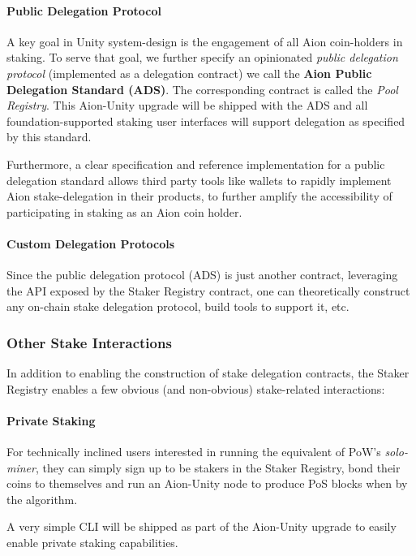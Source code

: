 \paragraph{Public Delegation Protocol}
A key goal in Unity system-design is the engagement of all Aion coin-holders in staking. To serve that goal, we further specify an opinionated \textit{public delegation protocol} (implemented as a delegation contract) we call the \textbf{Aion Public Delegation Standard (ADS)}. The corresponding contract is called the \textit{Pool Registry}. This Aion-Unity upgrade will be shipped with the ADS and all foundation-supported staking user interfaces will support delegation as specified by this standard. 

Furthermore, a clear specification and reference implementation for a public delegation standard allows third party tools like wallets to rapidly implement Aion stake-delegation in their products, to further amplify the accessibility of participating in staking as an Aion coin holder. 
    
\paragraph{Custom Delegation Protocols}
Since the public delegation protocol (ADS) is just another contract, leveraging the API exposed by the Staker Registry contract, one can theoretically construct any on-chain stake delegation protocol, build tools to support it, etc. 

\subsubsection{Other Stake Interactions} \label{staker_reg_interactions}

In addition to enabling the construction of stake delegation contracts, the Staker Registry enables a few obvious (and non-obvious) stake-related interactions:

\paragraph{Private Staking}
For technically inclined users interested in running the equivalent of PoW's \textit{solo-miner}, they can simply sign up to be stakers in the Staker Registry, bond their coins to themselves and run an Aion-Unity node to produce PoS blocks when  by the algorithm. 

A very simple CLI will be shipped as part of the Aion-Unity upgrade to easily enable private staking capabilities. 

